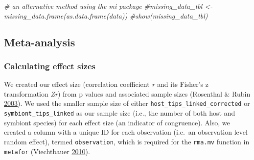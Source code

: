 \documentclass[
]{article}
\newenvironment{Shaded}{\begin{snugshade}}{\end{snugshade}}
\newcommand{\CommentTok}[1]{\textcolor[rgb]{0.56,0.35,0.01}{\textit{#1}}}
\begin{document}
\begin{Shaded}
\begin{Highlighting}[]
\CommentTok{# an alternative method using the mi package}
\CommentTok{#missing_data_tbl <- missing_data.frame(as.data.frame(data))}
\CommentTok{#show(missing_data_tbl) }
\end{Highlighting}
\end{Shaded}

\hypertarget{meta-analysis}{%
\subsection{Meta-analysis}\label{meta-analysis}}

\hypertarget{calculating-effect-sizes}{%
\subsubsection{Calculating effect
sizes}\label{calculating-effect-sizes}}

We created our effect size (correlation coefficient \emph{r} and its
Fisher's z transformation \emph{Zr}) from p values and associated sample
sizes (Rosenthal \& Rubin
\protect\hyperlink{ref-rosenthal2003requivalent}{2003}). We used the
smaller sample size of either \texttt{host\_tips\_linked\_corrected} or
\texttt{symbiont\_tips\_linked} as our sample size (i.e., the number of
both host and symbiont species) for each effect size (an indicator of
congruence). Also, we created a column with a unique ID for each
observation (i.e.~an observation level random effect), termed
\texttt{observation}, which is required for the \texttt{rma.mv} function
in \texttt{metafor} (Viechtbauer
\protect\hyperlink{ref-viechtbauer2010conducting}{2010}).
\end{document}
